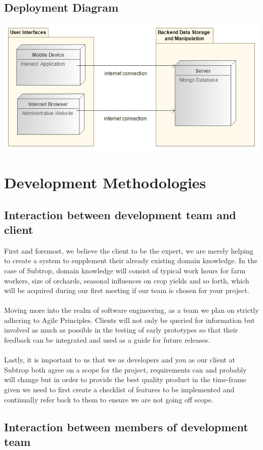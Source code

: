 \documentclass[12pt,a4paper]{article}
\begin{document}
\subsection{Deployment Diagram}
\begin{center}
	\includegraphics[width=0.5\linewidth]{deployment.png}
\end{center}

\section{Development Methodologies}
\subsection{Interaction between development team and client}

\textnormal First and foremost, we believe the client to be the expert, we are merely helping to create
			a system to supplement their already existing domain knowledge. In the case of Subtrop, domain knowledge will consist of typical work hours for farm workers, size of orchards, seasonal influences on crop yields and so forth, which will be acquired during our first meeting if our team is chosen for your project.
			\\ \\
			Moving more into the realm of software engineering, as a team we plan on strictly adhering 
			to Agile Principles. Clients will not only be queried for information but involved as much
			as possible in the testing of early prototypes so that their feedback can be integrated and 
			used as a guide for future releases.
			\\ \\
			Lastly, it is important to us that we as developers and you as our client at Subtrop both 
			agree on a scope for the project, requirements can and probably will change but in order
			to provide the best quality product in the time-frame given we need to first create a checklist of features to be implemented and continually refer back to them to ensure we are not going off scope.
				

\subsection{Interaction between members of development team}
\end{document}
